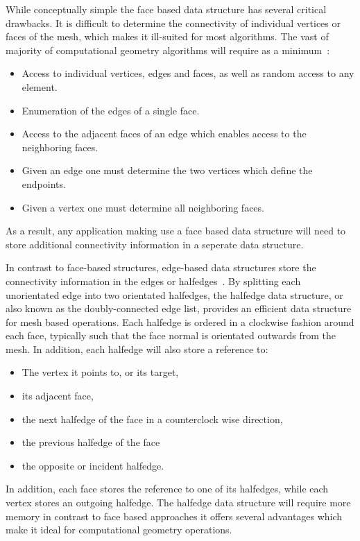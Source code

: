 While conceptually simple the face based data structure has several critical drawbacks.
It is difficult to determine the connectivity of individual vertices or faces of the mesh, which makes it ill-suited for most algorithms.
The vast of majority of computational geometry algorithms will require as a minimum~\cite{botsch2010}:
\begin{itemize}
    \item Access to individual vertices, edges and faces, as well as random access to any element.
    \item Enumeration of the edges of a single face.
    \item Access to the adjacent faces of an edge which enables access to the neighboring faces.
    \item Given an edge one must determine the two vertices which define the endpoints.
    \item Given a vertex one must determine all neighboring faces.
\end{itemize}
As a result, any application making use a face based data structure will need to store additional connectivity information in a seperate data structure.

In contrast to face-based structures, edge-based data structures store the connectivity information in the edges or halfedges~\cite{botsch2010,orourke1998,berg2008}.
By splitting each unorientated edge into two orientated halfedges, the halfedge data structure, or also known as the doubly-connected edge list, provides an efficient data structure for mesh based operations.
Each halfedge is ordered in a clockwise fashion around each face, typically such that the face normal is orientated outwards from the mesh.
In addition, each halfedge will also store a reference to:
\begin{itemize}
    \item The vertex it points to, or its target,
    \item its adjacent face,
    \item the next halfedge of the face in a counterclock wise direction,
    \item the previous halfedge of the face
    \item the opposite or incident halfedge.
\end{itemize}
In addition, each face stores the reference to one of its halfedges, while each vertex stores an outgoing halfedge. 
The halfedge data structure will require more memory in contrast to face based approaches it offers several advantages which make it ideal for computational geometry operations.

